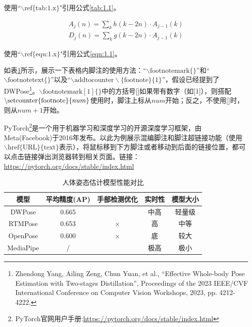 \documentclass[a4paper,scheme=chinese,linespread=1.5]{ctexbook} %
\begin{document}
	使用“\textbf{$\backslash \text{ref\{tab:1.x\}}$}"引用公式\ref{tab:1.1}。
	
	\begin{align}
		A_j(n)= \sum_{k}^{}  h(k-2n) \cdot A_{j-1}(k) \\
		D_j(n)= \sum_{k}^{}  g(k-2n) \cdot A_{j-1}(k)
		\label{equ:1.1}
	\end{align}
	
	使用“\textbf{$\backslash \text{ref\{equ:1.x\}}$}"引用公式\ref{equ:1.1}。
	
	\newpage
	
	如表\ref{tab:1.2}所示，展示一下表格内脚注的使用方法：“$\backslash \text{footnotemark}\{\}$”和“$\backslash \text{footnotetext\{\}}$”以及“$\backslash \text{addtocounter} \backslash \text{\{footnote\}\{1\}}$”，假设已经提到了DWPose\footnote{Zhendong Yang, Ailing Zeng, Chun Yuan, et al., “Effective Whole-body Pose Estimation with Two-stages Distillation”, Proceedings of the 2023 IEEE/CVF International Conference on Computer Vision Workshops, 2023, pp. 4212-4222.}。$\backslash \text{footnotemark} [ 1 ]\{\}$中的方括号[]如果带有数字（如[1]），则搭配$\backslash \text{setcounter\{footnote\}\{}\mathnormal{num}\text{\}}$使用时，脚注上标从$num$开始；反之，不使用[]时，则从$num+1$开始。
	
	PyTorch\footnote{PyTorch官网用户手册:\href{https://pytorch.org/docs/stable/index.html}{https://pytorch.org/docs/stable/index.html}}是一个用于机器学习和深度学习的开源深度学习框架，由Meta(Facebook)于2016年发布。以此为例展示混编脚注和脚注超链接功能（使用$\backslash \text{href\{URL\}\{text\}}$表示），将鼠标移到下方脚注\footnotemark[2]{}或者移动到后面的链接位置，都可以点击链接弹出浏览器转到相关页面。链接：\href{https://pytorch.org/docs/stable/index.html}{https://pytorch.org/docs/stable/index.html}
	
	
	\begin{table}[H]
		\centering
		\caption{人体姿态估计模型性能对比}
		\vspace*{-1em}
		\begin{tabular}{ccccc} %
			\toprule[1.5pt]
			模型   &  平均精度(AP) & 手部检测优化 & 实时性 & 模型大小 \\ \midrule[0.75pt]
			\setcounter{footnote}{1}
			DWPose\footnotemark[2]{}    & 0.665      & \checkmark                 & 中高       & 轻量级         \\
			\setcounter{footnote}{3}
			RTMPose\footnotemark[1]{}     & 0.653      & $\times$                & 高      &  中等          \\
			OpenPose\footnotemark{}    & 0.600        & $\times$                & 底       &  较大            \\ \cmidrule[0.5pt]{1-2}
			MediaPipe\footnotemark{}     & /      &  \checkmark                 & 极高       &  极小        \\
			\bottomrule[1.5pt]
		\end{tabular}
		\label{tab:1.2}
	\end{table}
	
\end{document}

